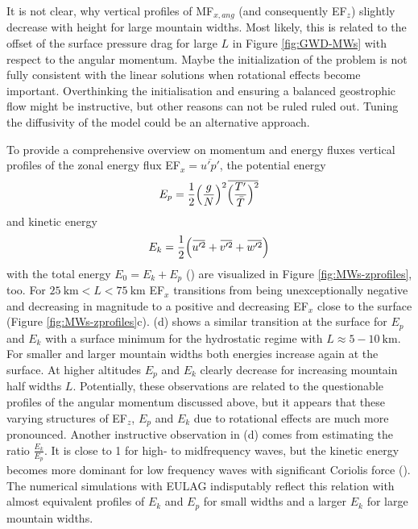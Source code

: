 It is not clear, why vertical profiles of MF$_{x,ang}$ (and consequently EF$_z$) slightly decrease with height for large mountain widths. Most likely, this is related to the offset of the surface pressure drag for large $L$ in Figure \ref{fig:GWD-MWs} with respect to the angular momentum. Maybe the initialization of the problem is not fully consistent with the linear solutions when rotational effects become important. Overthinking the initialisation and ensuring a balanced geostrophic flow might be instructive, but other reasons can not be ruled ruled out. Tuning the diffusivity of the model could be an alternative approach.

To provide a comprehensive overview on momentum and energy fluxes vertical profiles of the zonal energy flux EF$_x = \overbar{u'p'}$, the potential energy 
\begin{equation}
    E_p = \frac{1}{2} \Bigl(\frac{g}{N}\Bigr)^2 \overbar{\Bigl(\frac{T'}{\bar{T}}\Bigr)^2}
    \label{equ:epot-density}
\end{equation}
and kinetic energy
\begin{equation}
    E_k = \frac{1}{2} \Bigl(\overbar{u'^2} + \overbar{v'^2} + \overbar{w'^2}\Bigr)
    \label{equ:ekin-density}
\end{equation}
with the total energy $E_0 = E_k + E_p$ (\cite[]{tsuda_global_2000}) are visualized in Figure \ref{fig:MWs-zprofiles}, too. For $ \SI{25}{\kilo\meter} < L < \SI{75}{\kilo\meter}$ EF$_x$ transitions from being unexceptionally negative and decreasing in magnitude to a positive and decreasing EF$_x$ close to the surface (Figure \ref{fig:MWs-zprofiles}c). (d) shows a similar transition at the surface for $E_p$ and $E_k$ with a surface minimum for the hydrostatic regime with $L \approx 5-\SI{10}{\kilo\meter}$. For smaller and larger mountain widths both energies increase again at the surface. At higher altitudes $E_p$ and $E_k$ clearly decrease for increasing mountain half widths $L$. Potentially, these observations are related to the questionable profiles of the angular momentum discussed above, but it appears that these varying structures of EF$_z$, $E_p$ and $E_k$ due to rotational effects are much more pronounced. Another instructive observation in (d) comes from estimating the ratio $\frac{E_k}{E_p}$. It is close to 1 for high- to midfrequency waves, but the kinetic energy becomes more dominant for low frequency waves with significant Coriolis force (\cite[]{gill_atmosphere-ocean_1982}). The numerical simulations with EULAG indisputably reflect this relation with almost equivalent profiles of $E_k$ and $E_p$ for small widths and a larger $E_k$ for large mountain widths.

